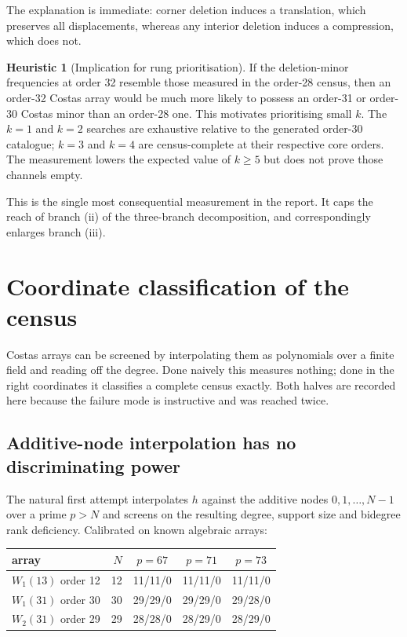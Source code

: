 \documentclass[11pt,a4paper]{article}
\theoremstyle{definition}
\newtheorem{heuristic}[theorem]{Heuristic}
\begin{document}
The explanation is immediate: corner deletion induces a translation, which
preserves all displacements, whereas any interior deletion induces a compression,
which does not.

\begin{heuristic}[Implication for rung prioritisation]
\label{cor:ladder-value}
If the deletion-minor frequencies at order 32 resemble those measured in the
order-28 census, then an order-32 Costas array would be much more likely to
possess an order-31 or order-30 Costas minor than an order-28 one. This motivates
prioritising small $k$. The $k=1$ and $k=2$ searches are exhaustive relative to
the generated order-30 catalogue; $k=3$ and $k=4$ are census-complete at their
respective core orders. The measurement lowers the expected value of $k\ge5$ but
does not prove those channels empty.
\end{heuristic}

This is the single most consequential measurement in the report. It caps the
reach of branch (ii) of the three-branch decomposition, and correspondingly
enlarges branch (iii).


\section{Coordinate classification of the census}
\label{sec:coords}

Costas arrays can be screened by interpolating them as polynomials over a finite
field and reading off the degree. Done naively this measures nothing; done in the
right coordinates it classifies a complete census exactly. Both halves are
recorded here because the failure mode is instructive and was reached twice.

\subsection{Additive-node interpolation has no discriminating power}

The natural first attempt interpolates $h$ against the additive nodes
$0,1,\dots,N-1$ over a prime $p>N$ and screens on the resulting degree, support
size and bidegree rank deficiency. Calibrated on known algebraic arrays:

\begin{center}
\begin{tabular}{@{}lrccc@{}}
\toprule
array & $N$ & $p=67$ & $p=71$ & $p=73$ \\
\midrule
$W_1(13)$ order 12 & 12 & 11/11/0 & 11/11/0 & 11/11/0 \\
$W_1(31)$ order 30 & 30 & 29/29/0 & 29/29/0 & 29/28/0 \\
$W_2(31)$ order 29 & 29 & 28/28/0 & 28/29/0 & 28/29/0 \\
\bottomrule
\end{tabular}
\end{center}
\end{document}
